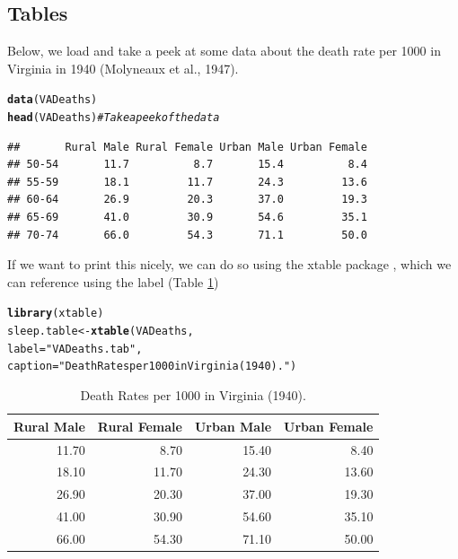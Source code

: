 \documentclass{article}\usepackage[]{graphicx}\usepackage[]{xcolor}
\makeatletter
\newcommand{\hlsng}[1]{\textcolor[rgb]{0.192,0.494,0.8}{#1}}%
\newcommand{\hlcom}[1]{\textcolor[rgb]{0.678,0.584,0.686}{\textit{#1}}}%
\newcommand{\hldef}[1]{\textcolor[rgb]{0.345,0.345,0.345}{#1}}%
\newcommand{\hlkwb}[1]{\textcolor[rgb]{0.69,0.353,0.396}{#1}}%
\newcommand{\hlkwc}[1]{\textcolor[rgb]{0.333,0.667,0.333}{#1}}%
\newcommand{\hlkwd}[1]{\textcolor[rgb]{0.737,0.353,0.396}{\textbf{#1}}}%
\newenvironment{kframe}{%
 \def\at@end@of@kframe{}%
 \ifinner\ifhmode%
  \def\at@end@of@kframe{\end{minipage}}%
  \begin{minipage}{\columnwidth}%
 \fi\fi%
 \def\FrameCommand##1{\hskip\@totalleftmargin \hskip-\fboxsep
 \colorbox{shadecolor}{##1}\hskip-\fboxsep
     \hskip-\linewidth \hskip-\@totalleftmargin \hskip\columnwidth}%
 \MakeFramed {\advance\hsize-\width
   \@totalleftmargin\z@ \linewidth\hsize
   \@setminipage}}%
 {\par\unskip\endMakeFramed%
 \at@end@of@kframe}
\newenvironment{knitrout}{}{} %
\makeatother
\begin{document}
\begin{multicols}{2}
\subsection{Tables}
Below, we load and take a peek at some data about the death rate per 1000 in Virginia in 1940 (Molyneaux et al., 1947).
\begin{knitrout}\scriptsize
{}\color{fgcolor}\begin{kframe}
\begin{alltt}
\hlkwd{data}\hldef{(VADeaths)}
\hlkwd{head}\hldef{(VADeaths)} \hlcom{# Take a peek of the data}
\end{alltt}
\begin{verbatim}
##       Rural Male Rural Female Urban Male Urban Female
## 50-54       11.7          8.7       15.4          8.4
## 55-59       18.1         11.7       24.3         13.6
## 60-64       26.9         20.3       37.0         19.3
## 65-69       41.0         30.9       54.6         35.1
## 70-74       66.0         54.3       71.1         50.0
\end{verbatim}
\end{kframe}
\end{knitrout}

If we want to print this nicely, we can do so using the xtable package \citep{xtable}, which we can reference using the label (Table \href{"VADeaths.tab"} 1)
\begin{knitrout}\scriptsize
{}\color{fgcolor}\begin{kframe}
\begin{alltt}
\hlkwd{library}\hldef{(xtable)}
\hldef{sleep.table}\hlkwb{<-}\hlkwd{xtable}\hldef{(VADeaths ,}
                    \hlkwc{label} \hldef{=} \hlsng{"VADeaths.tab"}\hldef{,}
                    \hlkwc{caption} \hldef{=} \hlsng{"Death Rates per 1000 in Virginia (1940)."}\hldef{)}
\end{alltt}
\end{kframe}
\end{knitrout}
\begin{table}[H]
\centering
\begingroup\small
\begin{tabular}{rrrr}
  \hline
Rural Male & Rural Female & Urban Male & Urban Female \\ 
  \hline
11.70 & 8.70 & 15.40 & 8.40 \\ 
  18.10 & 11.70 & 24.30 & 13.60 \\ 
  26.90 & 20.30 & 37.00 & 19.30 \\ 
  41.00 & 30.90 & 54.60 & 35.10 \\ 
  66.00 & 54.30 & 71.10 & 50.00 \\ 
   \hline
\end{tabular}
\endgroup
\caption{Death Rates per 1000 in Virginia (1940).} 
\label{VADeaths.tab}
\end{table}



\end{multicols}
\end{document}
